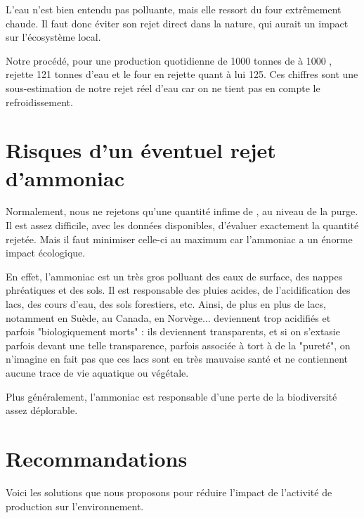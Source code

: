 \documentclass[a4paper, oneside]{scrartcl}
\begin{document}
L'eau n'est bien entendu pas polluante, mais elle ressort du four extrêmement chaude. Il faut donc éviter son rejet direct dans la nature, qui aurait un impact sur l'écosystème local.

Notre procédé, pour une production quotidienne de 1000 tonnes de  à 1000 \kelvin, rejette 121 tonnes d'eau et le four en rejette quant à lui 125. Ces chiffres sont une sous-estimation de notre rejet réel d'eau car on ne tient pas en compte le refroidissement.

\section{Risques d'un éventuel rejet d'ammoniac \cite{ammo1} \cite{ammo2} \cite{ammo3}}
Normalement, nous ne rejetons qu'une quantité infime de , au niveau de la purge. Il est assez difficile, avec les données disponibles, d'évaluer exactement la quantité rejetée. Mais il faut minimiser celle-ci au maximum car l'ammoniac a un énorme impact écologique.
 

En effet, l'ammoniac est un très gros polluant des eaux de surface, des nappes phréatiques et des sols. Il est responsable des pluies acides, de l'acidification des lacs, des cours d'eau, des sols forestiers, etc. Ainsi, de plus en plus de lacs, notamment en Suède, au Canada, en Norvège... deviennent trop acidifiés et parfois "biologiquement morts" : ils deviennent transparents, et si on s'extasie parfois devant une telle transparence, parfois associée à tort à de la "pureté", on n'imagine en fait pas que ces lacs sont en très mauvaise santé et ne contiennent aucune trace de vie aquatique ou végétale.
 

Plus généralement, l'ammoniac est responsable d'une perte de la biodiversité assez déplorable.

\section{Recommandations \cite{evaleco} \cite{lossprev}}
Voici les solutions que nous proposons pour réduire l'impact de l'activité de production sur l'environnement.
\end{document}
